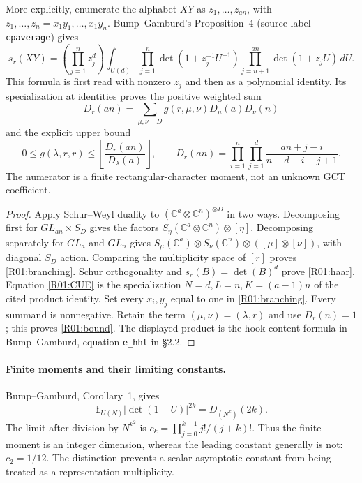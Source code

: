 More explicitly, enumerate the alphabet $XY$ as $z_1,\ldots,z_{an}$, with
$z_1,\ldots,z_n=x_1y_1,\ldots,x_1y_n$. Bump--Gamburd's Proposition~4
(source label \texttt{cpaverage}) gives
\begin{equation}\label{R01:CUE}
 s_r(XY)=\left(\prod_{j=1}^n z_j^d\right)
 \int_{U(d)}\prod_{j=1}^n\det(1+z_j^{-1}U^{-1})
 \prod_{j=n+1}^{an}\det(1+z_jU)\,dU.
\end{equation}
This formula is first read with nonzero $z_j$ and then as a polynomial identity.
Its specialization at identities proves the positive weighted sum
\begin{equation}\label{R01:dimension}
 D_r(an)=\sum_{\mu,\nu\vdash D}
 g(r,\mu,\nu)D_\mu(a)D_\nu(n)
\end{equation}
and the explicit upper bound
\begin{equation}\label{R01:bound}
 0\leq g(\lambda,r,r)\leq
 \left\lfloor\frac{D_r(an)}{D_\lambda(a)}\right\rfloor,
 \qquad
 D_r(an)=\prod_{i=1}^{n}\prod_{j=1}^{d}
 \frac{an+j-i}{n+d-i-j+1}.
\end{equation}
The numerator is a finite rectangular-character moment, not an unknown GCT
coefficient.

\begin{proof}
Apply Schur--Weyl duality to $(\mathbb C^a\otimes\mathbb C^n)^{\otimes D}$
in two ways. Decomposing first for $GL_{an}\times S_D$ gives the factors
$S_\eta(\mathbb C^a\otimes\mathbb C^n)\otimes[\eta]$.
Decomposing separately for $GL_a$ and $GL_n$ gives
$S_\mu(\mathbb C^a)\otimes S_\nu(\mathbb C^n)\otimes
([\mu]\otimes[\nu])$, with diagonal $S_D$ action. Comparing the multiplicity
space of $[r]$ proves \eqref{R01:branching}. Schur orthogonality and
$s_r(B)=\det(B)^d$ prove \eqref{R01:haar}. Equation \eqref{R01:CUE} is the
specialization $N=d,L=n,K=(a-1)n$ of the cited product identity.
Set every $x_i,y_j$ equal to one in \eqref{R01:branching}. Every summand is
nonnegative. Retain the term $(\mu,\nu)=(\lambda,r)$ and use
$D_r(n)=1$; this proves \eqref{R01:bound}. The displayed product is the
hook-content formula in Bump--Gamburd, equation \texttt{e\_hhl} in \S2.2.
\end{proof}

\paragraph{Finite moments and their limiting constants.}
Bump--Gamburd, Corollary~1, gives
\[
 \mathbb E_{U(N)}|\det(1-U)|^{2k}=D_{(N^k)}(2k).
\]
The limit after division by $N^{k^2}$ is
$c_k=\prod_{j=0}^{k-1}j!/(j+k)!$. Thus the finite moment is an integer
dimension, whereas the leading constant generally is not: $c_2=1/12$.
The distinction prevents a scalar asymptotic constant from being treated as
a representation multiplicity.

